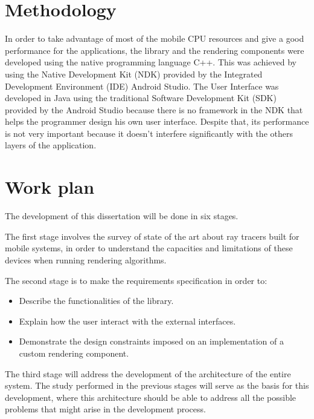 \section{Methodology}

\par
In order to take advantage of most of the mobile CPU resources and give a good performance for the applications, the library and the rendering components were developed using the native programming language C++.
This was achieved by using the Native Development Kit (NDK) provided by the Integrated Development Environment (IDE) Android Studio.
The User Interface was developed in Java using the traditional Software Development Kit (SDK) provided by the Android Studio because there is no framework in the NDK that helps the programmer design his own user interface.
Despite that, its performance is not very important because it doesn't interfere significantly with the others layers of the application.



\iffalse

\section{Work plan}

\par
The development of this dissertation will be done in six stages.

\par
The first stage involves the survey of state of the art about ray tracers built for mobile systems, in order to understand the capacities and limitations of these devices when running rendering algorithms.

\par
The second stage is to make the requirements specification in order to:

\begin{itemize}
\item Describe the functionalities of the library.
\item Explain how the user interact with the external interfaces.
\item Demonstrate the design constraints imposed on an implementation of a custom rendering component.
\end{itemize}

\par
The third stage will address the development of the architecture of the entire system.
The study performed in the previous stages will serve as the basis for this development, where this architecture should be able to address all the possible problems that might arise in the development process.

